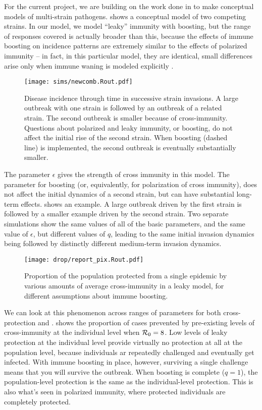 For the current project, we are building on the work done in \cite{arcBoost} to make conceptual models of multi-strain pathogens.  shows a conceptual model of two competing strains. In our model, we model “leaky” immunity with boosting, but the range of responses covered is actually broader than this, because the effects of immune boosting on incidence patterns are extremely similar to the effects of polarized immunity – in fact, in this particular model, they are identical, small differences arise only when immune waning is modeled explicitly \cite{arcBoost}.

\begin{figure}
\texttt{[image: sims/newcomb.Rout.pdf]}
\caption{
	Disease incidence through time in successive strain invasions. A large outbreak with one strain is followed by an outbreak of a related strain. The second outbreak is smaller because of cross-immunity. Questions about polarized and leaky immunity, or boosting, do not affect the initial rise of the second strain. When boosting (dashed line) is implemented, the second outbreak is eventually substantially smaller.
}
\end{figure}

The parameter $\epsilon$ gives the strength of cross immunity in this model. The parameter for boosting (or, equivalently, for polarization of cross immunity), does not affect the initial dynamics of a second strain, but can have substantial long-term effects.  shows an example. A large outbreak driven by the first strain is followed by a smaller example driven by the second strain. Two separate simulations show the same values of all of the basic parameters, and the same value of $\epsilon$, but different values of $q$, leading to the same initial invasion dynamics being followed by distinctly different medium-term invasion dynamics.

\begin{figure}
\texttt{[image: drop/report\_pix.Rout.pdf]}
\caption{
Proportion of the population protected from a single epidemic by various amounts of average cross-immunity in a leaky model, for different assumptions about immune boosting.
}
\end{figure}

We can look at this phenomenon across ranges of parameters for both cross-protection and \Reff.  shows the proportion of cases prevented by pre-existing levels of cross-immunity at the individual level when $\mathcal R_0=8$. Low levels of leaky protection at the individual level provide virtually no protection at all at the population level, because individuals ar repeatedly challenged and eventually get infected. With immune boosting in place, however, surviving a single challenge means that you will survive the outbreak. When boosting is complete ($q=1$), the population-level protection is the same as the individual-level protection. This is also what's seen in polarized immunity, where protected individuals are completely protected.

